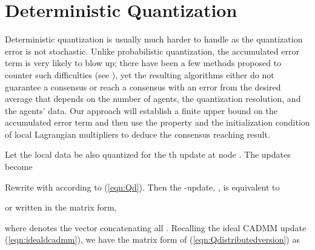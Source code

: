 \documentclass[journal]{IEEEtran}
\begin{document}
\section{Deterministic Quantization} 
\label{sec:DQ}
Deterministic quantization is usually much harder to handle as the quantization error is not stochastic. Unlike probabilistic quantization, the accumulated error term is very likely to blow up; there have been a few methods proposed to counter such difficulties (see \cite{Nedic2009,Chamie2014,Carli2010}), yet the resulting algorithms either do not guarantee a consensus or reach a consensus with an error from the desired average that depends on the number of agents, the quantization resolution, and the agents' data. Our approach will establish a finite upper bound on the accumulated error term and then use the property and the initialization condition of local Lagrangian multipliers to deduce the consensus reaching result.

Let the local data  be also quantized for the th update at node . The updates become

Rewrite  with  according to (\ref{eqn:Qd}). Then the -update, , is equivalent to 

or written in the matrix form,

where  denotes the vector concatenating all . Recalling the ideal CADMM update (\ref{eqn:idealdcadmm}), we have the matrix form of (\ref{eqn:Qdistributedversion}) as
\end{document}
